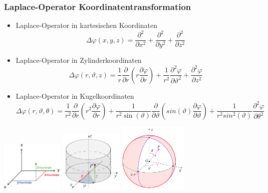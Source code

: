 \subsubsection{Laplace-Operator Koordinatentransformation}
\begin{minipage}{15cm}

\begin{itemize}
	\item Laplace-Operator in kartesischen Koordinaten
	\[\Delta \varphi(x,y,z) = \frac{\partial^{2}}{\partial x^{2}}+\frac{\partial^{2}}{\partial y^{2}}+\frac{\partial^{2}}{\partial z^{2}}\]\vspace{0.5cm}
	\item Laplace-Operator in Zylinderkoordinaten
	\[\Delta \varphi(r,\vartheta,z) = \frac{1}{r} \dfrac{\partial}{\partial r} \left(r \frac{\partial \varphi}{\partial r}\right) + \frac{1}{r^2}\frac{\partial^2 \varphi}{\partial \vartheta^2}+\dfrac{\partial^2 \varphi}{\partial z^2} \]
    \vspace{0.5cm}
	\item Laplace-Operator in Kugelkoordinaten
	\[\Delta \varphi(r,\vartheta,\theta) = \frac{1}{r^2} \dfrac{\partial}{\partial r} \left( r^2 \frac{\partial \varphi}{\partial r}\right) + \frac{1}{r^2 \sin(\vartheta)}\frac{\partial}{\partial \vartheta}\left(sin(\vartheta)\dfrac{\partial \varphi}{\partial \vartheta} \right) +\frac{1}{r^2 sin^2(\vartheta)}\dfrac{\partial^2 \varphi}{\partial \theta^2}\]
\end{itemize}
\end{minipage}
\begin{minipage}{4cm}
\includegraphics[width=3cm]{images/KartKoord.png}\newline
\includegraphics[width=3cm]{images/Cylindrical_Coordinates.png}\newline
\includegraphics[width=3.3cm]{images/Kugelkoord.png}
\end{minipage}
